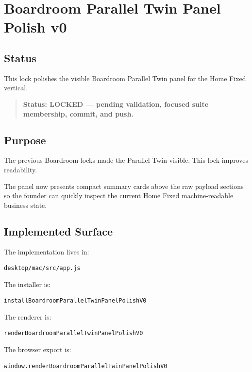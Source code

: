 \section{Boardroom Parallel Twin Panel Polish v0}
\label{sec:aion-boardroom-parallel-twin-panel-polish-v0}

\subsection{Status}

This lock polishes the visible Boardroom Parallel Twin panel for the Home Fixed vertical.

\begin{quote}
\textbf{Status: LOCKED --- pending validation, focused suite membership, commit, and push.}
\end{quote}

\subsection{Purpose}

The previous Boardroom locks made the Parallel Twin visible. This lock improves readability.

The panel now presents compact summary cards above the raw payload sections so the founder can quickly inspect the current Home Fixed machine-readable business state.

\subsection{Implemented Surface}

The implementation lives in:

\begin{verbatim}
desktop/mac/src/app.js
\end{verbatim}

The installer is:

\begin{verbatim}
installBoardroomParallelTwinPanelPolishV0
\end{verbatim}

The renderer is:

\begin{verbatim}
renderBoardroomParallelTwinPanelPolishV0
\end{verbatim}

The browser export is:

\begin{verbatim}
window.renderBoardroomParallelTwinPanelPolishV0
\end{verbatim}

